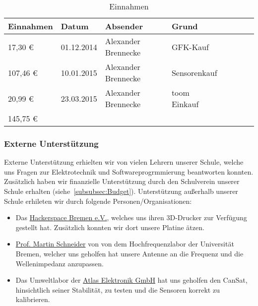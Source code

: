 \begin{table}[htbp]
  \centering
    \begin{tabular}{p{}p{}p{}p{}rrrl}
    \toprule
    \multicolumn{1}{c}{\textbf{Einnahmen}} & \textbf{Datum} & \textbf{Absender} & \textbf{Grund} \\
    \midrule
              17,30 \euro  & 01.12.2014 & Alexander Brennecke & GFK-Kauf \\
           107,46 \euro  & 10.01.2015 & Alexander Brennecke & Sensorenkauf \\
              20,99 \euro  & 23.03.2015 & Alexander Brennecke & toom Einkauf \\
    \bottomrule
    145,75 \euro & & & \\
    \bottomrule
    \end{tabular}%
	\caption{Einnahmen}
  \label{tab:budgeteinnahmen}%
\end{table}%

\subsubsection{Externe Unterstützung}
Externe Unterstützung erhielten wir von vielen Lehrern unserer Schule, welche uns Fragen zur Elektrotechnik und Softwareprogrmmierung beantworten konnten. Zusätzlich haben wir finanzielle Unterstützung durch den Schulverein unserer Schule erhalten (siehe~\ref{subsubsec:Budget}).
Unterstützung außerhalb unserer Schule erhileten wir durch folgende Personen/Organisationen:

\begin{itemize}
	\item Das \href{https://www.hackerspace-bremen.de/}{Hackerspace Bremen e.V.}, welches uns ihren 3D-Drucker zur Verfügung gestellt hat. Zusätzlich konnten wir dort unsere Platine ätzen.
	\item \href{http://de.wikipedia.org/wiki/Martin_Schneider_(Nachrichtentechniker)} {Prof. Martin Schneider} von von dem Hochfrequenzlabor der Universität Bremen, welcher uns geholfen hat unsere Antenne an die Frequenz und die Wellenimpedanz anzupassen.
	\item  Das Umweltlabor der \href{http://www.atlas-elektronik.com/atlas-elektronik/}{Atlas Elektronik GmbH} hat uns geholfen den CanSat, hinsichtlich seiner Stabilität, zu testen und die Sensoren korrekt zu kalibrieren.
\end{itemize}